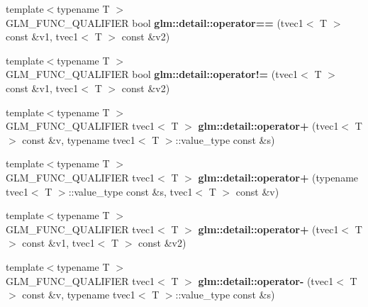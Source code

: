 \begin{DoxyCompactItemize}
\item 
\hypertarget{namespaceglm_1_1detail_a73b150423d0880aaccd2dabbc9008cdb}{{\footnotesize template$<$typename T $>$ }\\G\-L\-M\-\_\-\-F\-U\-N\-C\-\_\-\-Q\-U\-A\-L\-I\-F\-I\-E\-R bool {\bfseries glm\-::detail\-::operator==} (tvec1$<$ T $>$ const \&v1, tvec1$<$ T $>$ const \&v2)}\label{namespaceglm_1_1detail_a73b150423d0880aaccd2dabbc9008cdb}

\item 
\hypertarget{namespaceglm_1_1detail_a611e8f2c930d31e758eaa74fa15c3145}{{\footnotesize template$<$typename T $>$ }\\G\-L\-M\-\_\-\-F\-U\-N\-C\-\_\-\-Q\-U\-A\-L\-I\-F\-I\-E\-R bool {\bfseries glm\-::detail\-::operator!=} (tvec1$<$ T $>$ const \&v1, tvec1$<$ T $>$ const \&v2)}\label{namespaceglm_1_1detail_a611e8f2c930d31e758eaa74fa15c3145}

\item 
\hypertarget{namespaceglm_1_1detail_a2580bdc3b66eee924d83e01e904b1149}{{\footnotesize template$<$typename T $>$ }\\G\-L\-M\-\_\-\-F\-U\-N\-C\-\_\-\-Q\-U\-A\-L\-I\-F\-I\-E\-R tvec1$<$ T $>$ {\bfseries glm\-::detail\-::operator+} (tvec1$<$ T $>$ const \&v, typename tvec1$<$ T $>$\-::value\-\_\-type const \&s)}\label{namespaceglm_1_1detail_a2580bdc3b66eee924d83e01e904b1149}

\item 
\hypertarget{namespaceglm_1_1detail_ad221a83a6f3d41d77f8650043f1ba5ef}{{\footnotesize template$<$typename T $>$ }\\G\-L\-M\-\_\-\-F\-U\-N\-C\-\_\-\-Q\-U\-A\-L\-I\-F\-I\-E\-R tvec1$<$ T $>$ {\bfseries glm\-::detail\-::operator+} (typename tvec1$<$ T $>$\-::value\-\_\-type const \&s, tvec1$<$ T $>$ const \&v)}\label{namespaceglm_1_1detail_ad221a83a6f3d41d77f8650043f1ba5ef}

\item 
\hypertarget{namespaceglm_1_1detail_a6145953121c50379992aba18340c58d3}{{\footnotesize template$<$typename T $>$ }\\G\-L\-M\-\_\-\-F\-U\-N\-C\-\_\-\-Q\-U\-A\-L\-I\-F\-I\-E\-R tvec1$<$ T $>$ {\bfseries glm\-::detail\-::operator+} (tvec1$<$ T $>$ const \&v1, tvec1$<$ T $>$ const \&v2)}\label{namespaceglm_1_1detail_a6145953121c50379992aba18340c58d3}

\item 
\hypertarget{namespaceglm_1_1detail_a0218e4cee708b6b91e48baa5bbea5954}{{\footnotesize template$<$typename T $>$ }\\G\-L\-M\-\_\-\-F\-U\-N\-C\-\_\-\-Q\-U\-A\-L\-I\-F\-I\-E\-R tvec1$<$ T $>$ {\bfseries glm\-::detail\-::operator-\/} (tvec1$<$ T $>$ const \&v, typename tvec1$<$ T $>$\-::value\-\_\-type const \&s)}\label{namespaceglm_1_1detail_a0218e4cee708b6b91e48baa5bbea5954}


\end{DoxyCompactItemize}
